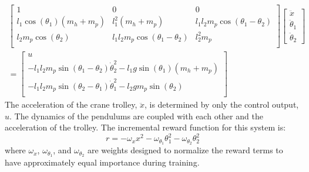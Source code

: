 %
\begin{multline}
\left [
\begin{array}{ccc}
1 & 0 & 0\\
l_1\cos(\theta_1)(m_h + m_p) & l_1^2(m_h + m_p) & l_1l_2m_p\cos(\theta_1-\theta_2)\\
l_2m_p\cos(\theta_2) & l_1l_2m_p\cos{(\theta_1-\theta_2)} & l_2^2m_p\\
\end{array}
\right ]
\left [
\begin{array}{c}
\ddot{x}\\
\ddot{\theta}_1\\
\ddot{\theta}_2
\end{array}
\right ] \\
=
\left [
\begin{array}{c}
u\\
-l_1l_2m_p\sin(\theta_1-\theta_2)\dot{\theta}_2^2 - l_1g\sin(\theta_1)(m_h + m_p)\\
-l_1l_2m_p\sin(\theta_2-\theta_1)\dot{\theta}_1^2 - l_2gm_p\sin(\theta_2)\\
\end{array}
\right ]
\end{multline}
%
The acceleration of the crane trolley, $\ddot{x}$, is determined by only the control output, $u$. The dynamics of the pendulums are coupled with each other and the acceleration of the trolley.
%
The incremental reward function for this system is:
%
\begin{equation}
r = -\omega_xx^2 - \omega_{\theta_1}\theta_1^2 - \omega_{\theta_2}\theta_2^2
\label{eq_chap2:reward_crane}
\end{equation}
%
where $\omega_x$, $\omega_{\theta_1}$, and $\omega_{\theta_2}$ are weights designed to normalize the reward terms to have approximately equal importance during training.

